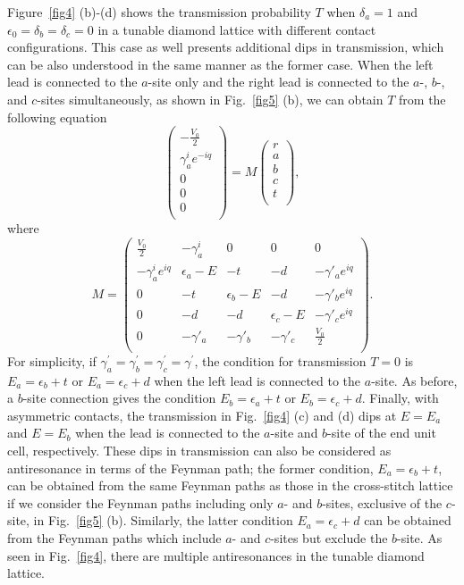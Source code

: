 \documentclass[twocolumn,showpacs,epsfig,pre]{revtex4}
\begin{document}
Figure~\ref{fig4} (b)-(d) shows the transmission probability $T$ when $\delta_a = 1$ and $\epsilon_0 = \delta_b = \delta_c = 0$ in a tunable diamond lattice with different contact configurations. 
This case as well presents additional dips in transmission, which can be also understood in the same manner as the former case.
When the left lead is connected to the $a$-site only and the right lead is connected to the $a$-, $b$-, and $c$-sites simultaneously,
as shown in Fig.~\ref{fig5} (b), we can obtain $T$ from the following equation
\begin{equation}
 \left(\begin{array}{c}
 -\frac{V_0}{2} \\
 \gamma_a^{i} e^{-i q} \\
 0 \\
 0 \\
 0 \\
\end{array}\right)=
M
\left(\begin{array}{c}
 r \\
 a \\
 b \\
 c\\
 t \\
\end{array}\right),
\end{equation}
where
\begin{equation}
M=
 \left(\begin{array}{ccccc} 	
 \frac{V_0}{2} & -\gamma_a^{i} & 0 & 0 & 0 \\
 -\gamma_a^{i} e^{i q} & \epsilon_a - E & -t & -d & -\gamma'_a e^{i q}  \\
 0 & -t & \epsilon_b - E & -d & -\gamma'_b e^{i q} \\
 0 & -d & -d & \epsilon_c - E & -\gamma'_c e^{i q} \\
 0 & -\gamma'_a & -\gamma'_b & -\gamma'_c & \frac{V_0}{2} \\
\end{array}\right).
\end{equation}
For simplicity, if $\gamma_a^{'}=\gamma_b^{'}=\gamma_c^{'}=\gamma^{'}$, the condition for transmission $T=0$ is $E_a = \epsilon_b + t$ or $E_a=\epsilon_c + d$ when the left lead is connected to the $a$-site.
As before, a $b$-site connection gives the condition $E_b = \epsilon_a+t$ or $E_b=\epsilon_c + d$.
Finally, with asymmetric contacts, the transmission in Fig.~\ref{fig4} (c) and (d) dips at $E=E_a$ and $E=E_b$ when the lead is connected to the $a$-site and $b$-site of the end unit cell, respectively.
These dips in transmission can also be considered as antiresonance in terms of the Feynman path;
the former condition, $E_a = \epsilon_b + t$, can be obtained from the same Feynman paths as those in the cross-stitch lattice if we consider the Feynman paths including only $a$- and $b$-sites, exclusive of the $c$-site, in Fig.~\ref{fig5} (b). Similarly, the latter condition $E_a=\epsilon_c + d$ can be obtained from the Feynman paths which include $a$- and $c$-sites but exclude the $b$-site. As seen in Fig.~\ref{fig4}, there are multiple antiresonances in the tunable diamond lattice.
\end{document}
